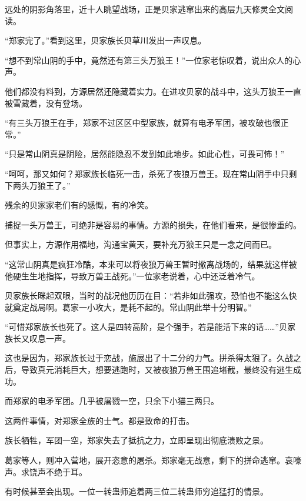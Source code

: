 
\begin{this_body}



远处的阴影角落里，近十人眺望战场，正是贝家逃窜出来的高层九天修灵全文阅读。

“郑家完了。”看到这里，贝家族长贝草川发出一声叹息。

“想不到常山阴的手中，竟然还有第三头万狼王！”一位家老惊叹着，说出众人的心声。

他们都没有料到，方源居然还隐藏着实力。在进攻贝家的战斗中，这头万狼王一直被雪藏着，没有登场。

“有三头万狼王在手，郑家不过区区中型家族，就算有电矛军团，被攻破也很正常。”

“只是常山阴真是阴险，居然能隐忍不发到如此地步。如此心性，可畏可怖！”

“呵呵，那又如何？郑家族长临死一击，杀死了夜狼万兽王。现在常山阴手中只剩下两头万狼王了。”

残余的贝家家老们有的感慨，有的冷笑。

捕捉一头万兽王，可绝非是容易的事情。方源的损失，在他们看来，是很惨重的。

但事实上，方源作用福地，沟通宝黄天，要补充万狼王只是一念之间而已。

“这常山阴真是疯狂冷酷，本来可以将夜狼万兽王暂时撤离战场的，结果就这样被他硬生生地指挥，导致万兽王战死。”一位家老说着，心中还泛着冷气。

贝家族长眯起双眼，当时的战况他历历在目：“若非如此强攻，恐怕也不能这么快就奠定战局啊。葛家一小攻大，是耗不起的。常山阴此举十分明智。”

“可惜郑家族长也死了。这人是四转高阶，是个强手，若是能活下来的话……”贝家族长又叹息一声。

这也是因为，郑家族长过于恋战，施展出了十二分的力气。拼杀得太狠了。久战之后，导致真元消耗巨大，想要逃跑时，又被夜狼万兽王围追堵截，最终没有逃生成功。

而郑家的电矛军团。几乎被屠戮一空，只余下小猫三两只。

这两件事情，对郑家全族的士气。都是致命的打击。

族长牺牲，军团一空，郑家失去了抵抗之力，立即呈现出彻底溃败之景。

葛家等人，则冲入营地，展开恣意的屠杀。郑家毫无战意，剩下的拼命逃窜。哀嚎声。求饶声不绝于耳。

有时候甚至会出现。一位一转蛊师追着两三位二转蛊师穷追猛打的情景。


\end{this_body}
